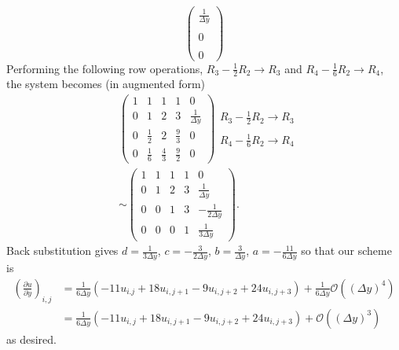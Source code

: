 \documentclass{article}
\begin{document}
\begin{itemize}
\[\begin{pmatrix}
        \tfrac{1}{\Delta y}\\\\
        0\\\\
        0
    \end{pmatrix}\]
    Performing the following row operations, $R_3 - \frac{1}{2}R_2 \to R_3$ and $R_4 - \frac{1}{6}R_2 \to R_4$, the system becomes (in augmented form)
    \begin{align*}
        &\left(\begin{array}{cccc|c}
            1 & 1 & 1 & 1 & 0\\
            0 & 1 & 2 & 3 & \tfrac{1}{\Delta y}\\
            0 & \tfrac{1}{2} & 2 & \tfrac{9}{3} & 0\\
            0 & \tfrac{1}{6} & \tfrac{4}{3} & \tfrac{9}{2} & 0
        \end{array}\right)\begin{array}{c}
            R_3 - \frac{1}{2}R_2 \to R_3\\\\
            R_4 - \frac{1}{6}R_2 \to R_4
        \end{array}\\
        &\sim\left(\begin{array}{cccc|c}
            1 & 1 & 1 & 1 & 0\\
            0 & 1 & 2 & 3 & \tfrac{1}{\Delta y}\\
            0 & 0 & 1 & 3 & -\tfrac{1}{2\Delta y}\\
            0 & 0 & 0 & 1 & \tfrac{1}{3\Delta y}
        \end{array}\right).
    \end{align*}
    Back substitution gives $d = \frac{1}{3\Delta y}$, $c = -\frac{3}{2\Delta y}$, $b = \frac{3}{\Delta y}$, $a = -\frac{11}{6\Delta y}$ so that our scheme is
    \begin{align*}
        \left(\frac{\partial u}{\partial y}\right)_{i,j} &= \frac{1}{6\Delta y}(-11 u_{i.j} + 18u_{i,j+1} - 9u_{i,j+2} + 24u_{i,j+3}) + \frac{1}{6\Delta y}\mathcal{O}((\Delta y)^4)\\
        &= \frac{1}{6\Delta y}(-11u_{i,j} + 18u_{i,j+1} - 9u_{i,j+2} + 24u_{i,j+3}) + \mathcal{O}((\Delta y)^3)
    \end{align*}
    as desired.

    

    \pagebreak



\end{itemize}
\end{document}
